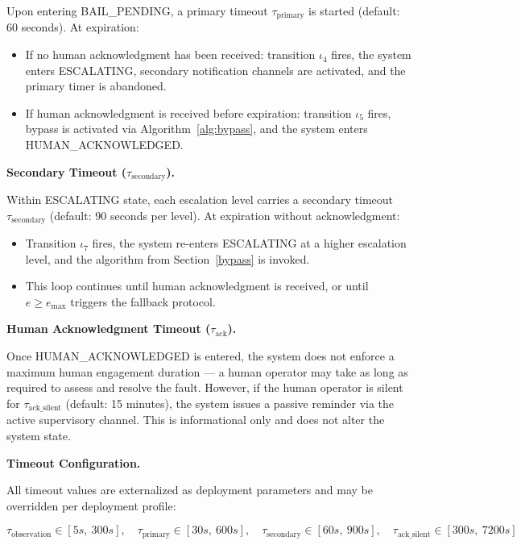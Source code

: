 Upon entering BAIL\_PENDING, a primary timeout $\tau_{\text{primary}}$ is started (default: 60 seconds). At expiration:

\begin{itemize}
  \item If no human acknowledgment has been received: transition $\iota_4$ fires, the system enters ESCALATING, secondary notification channels are activated, and the primary timer is abandoned.
  \item If human acknowledgment is received before expiration: transition $\iota_5$ fires, bypass is activated via Algorithm~\ref{alg:bypass}, and the system enters HUMAN\_ACKNOWLEDGED.
\end{itemize}

\bigskip
\noindent\textbf{Secondary Timeout ($\tau_{\text{secondary}}$).}

Within ESCALATING state, each escalation level carries a secondary timeout $\tau_{\text{secondary}}$ (default: 90 seconds per level). At expiration without acknowledgment:

\begin{itemize}
  \item Transition $\iota_7$ fires, the system re-enters ESCALATING at a higher escalation level, and the algorithm from Section~\ref{bypass} is invoked.
  \item This loop continues until human acknowledgment is received, or until $e \geq e_{\text{max}}$ triggers the fallback protocol.
\end{itemize}

\bigskip
\noindent\textbf{Human Acknowledgment Timeout ($\tau_{\text{ack}}$).}

Once HUMAN\_ACKNOWLEDGED is entered, the system does not enforce a maximum human engagement duration — a human operator may take as long as required to assess and resolve the fault. However, if the human operator is silent for $\tau_{\text{ack\_silent}}$ (default: 15 minutes), the system issues a passive reminder via the active supervisory channel. This is informational only and does not alter the system state.

\bigskip
\noindent\textbf{Timeout Configuration.}

All timeout values are externalized as deployment parameters and may be overridden per deployment profile:

\[
\tau_{\text{observation}} \in [5s,\ 300s],\quad
\tau_{\text{primary}} \in [30s,\ 600s],\quad
\tau_{\text{secondary}} \in [60s,\ 900s],\quad
\tau_{\text{ack\_silent}} \in [300s,\ 7200s]
\]

